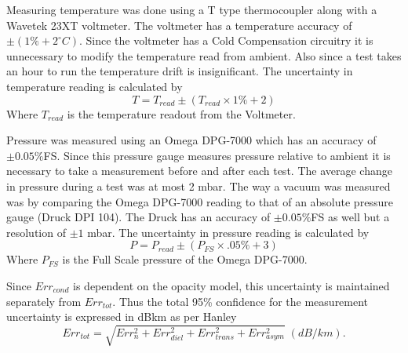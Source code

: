 Measuring temperature was done using a T type thermocoupler along with a Wavetek 23XT voltmeter. The voltmeter has a temperature accuracy of $\pm (1\% + 2^\circ C)$. Since the voltmeter has a Cold Compensation circuitry it is unnecessary to modify the temperature read from ambient. Also since a test takes an hour to run the temperature drift is insignificant. The uncertainty in temperature reading is calculated by
\begin{equation}
T = T_{read} \pm ( T_{read} \times 1\% + 2)
\end{equation}
Where $T_{read}$ is the temperature readout from the Voltmeter.

Pressure was measured using an Omega DPG-7000 which has an accuracy of $\pm 0.05\%$FS. Since this pressure gauge measures pressure relative to ambient it is necessary to take a measurement before and after each test. The average change in pressure during a test was at most 2 mbar. The way a vacuum was measured was by comparing the Omega DPG-7000 reading to that of an absolute pressure gauge (Druck DPI 104). The Druck has an accuracy of $\pm 0.05\%$FS as well but a resolution of $\pm 1$ mbar. The uncertainty in pressure reading is calculated by
\begin{equation}
P = P_{read} \pm ( P_{FS} \times .05\% + 3)
\end{equation}
Where $P_{FS}$ is the Full Scale pressure of the Omega DPG-7000.

Since $Err_{cond}$ is dependent on the opacity model, this uncertainty is maintained separately from $Err_{tot}$. Thus the total 95\% confidence for the measurement uncertainty is expressed in dB\/km as per Hanley \cite{Hanley-thesis}
\begin{equation}
Err_{tot} = \sqrt{Err_n^2 + Err_{diel}^2 + Err_{trans}^2 + Err_{asym}^2} \;(dB/km).
\end{equation}
